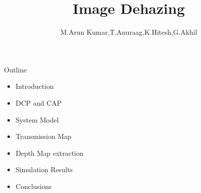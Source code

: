 \documentclass{beamer}
\title[Pilot Contamination\hspace{0.5cm} \insertframenumber/\inserttotalframenumber]{Image Dehazing}
\author{M.Arun Kumar,T.Anuraag,K.Hitesh,G.Akhil}
\institute[IIT Bombay]
\date{ }
\begin{document}
\begin{frame}
	\sffamily %
	\titlepage	
	\end{frame}

\begin{frame}[t]{Outline} \vspace*{0.7cm}
	\begin{itemize}
		\item Introduction
		\item DCP and CAP
		\item System Model
		\item Transmission Map
		\item Depth Map extraction
		\item Simulation Results 
		\item Conclusions
		
		
	\end{itemize}	
\end{frame}
\end{document}
